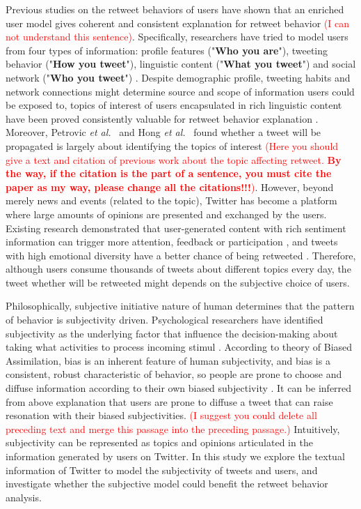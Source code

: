\documentclass{acm_proc_article-sp}
\newcommand{\mo}[1]{\textcolor{red}{#1}}
\begin{document}
Previous studies on the retweet behaviors of users have shown that an enriched user model gives coherent and consistent explanation for retweet behavior \cite{Abel:2011AUM,conf/icwsm/MacskassyM11,conf/wsdm/FengW13}  \mo{(I can not understand this 	
sentence)}. Specifically, researchers have tried to model users from four types of information:
profile features ("\textbf{Who you are}"), tweeting behavior ("\textbf{How you tweet}"), linguistic content ("\textbf{What you tweet}") and social network ("\textbf{Who you tweet}") \cite{Pennacchiotti:icwsm11}. 
Despite demographic profile, tweeting habits and network connections might determine source and scope of information users could be exposed to, topics of interest of users encapsulated in rich linguistic content have been proved consistently valuable for retweet behavior explanation \cite{conf/icwsm/MacskassyM11}. Moreover,
Petrovic \emph{et al.}~\cite{Osborne_Lavrenko_2011} and Hong \emph{et al.}~\cite{ericmedvet:hong2011} found whether a tweet will be propagated is largely about identifying the topics of interest \mo{(Here you should give a text and citation of previous work about the topic affecting retweet. \textbf{By the way, if the citation is the part of a sentence, you must cite the paper as my way, please change all the citations!!!})}. However, beyond merely news and events (related to the topic), Twitter has become a platform where large amounts of opinions are presented and exchanged by the users. Existing research demonstrated that user-generated content with rich sentiment information can trigger more attention, feedback or participation \cite{DBLP:conf/hicss/StieglitzD12}, and tweets with high emotional diversity have a better chance of being retweeted \cite{conf/icwsm/PfitznerGS12}. Therefore, although users consume thousands of tweets about different topics every day, the tweet whether will be retweeted might depends on the subjective choice of users. 

Philosophically, subjective initiative nature of human determines that the pattern of behavior is subjectivity driven.
Psychological researchers have identified subjectivity as the underlying factor that influence the decision-making about taking what activities to process incoming stimul \cite{Moore2008}.
According to theory of Biased Assimilation, bias is an inherent feature of human subjectivity, and bias is a consistent, robust characteristic of behavior, so people are prone to choose and diffuse information according to their own biased subjectivity \cite{Hyman2000,sunstein2009rumors}.
It can be inferred from above explanation that users are prone to diffuse a tweet that can raise resonation with their biased subjectivities. \mo{(I suggest you could delete all preceding text and merge this passage into the preceding passage.)} Intuitively, subjectivity can be represented as topics and opinions articulated in the information generated by users on Twitter.  In this study we explore the textual information of Twitter to model the subjectivity of tweets and users, and investigate whether the subjective model could benefit the retweet behavior analysis. 
\end{document}
